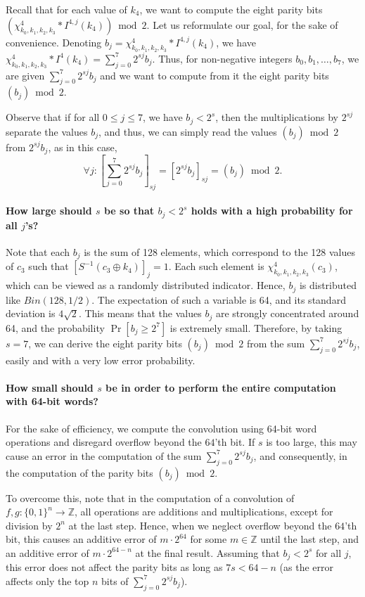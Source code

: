 Recall that for each value of $k_4$, we want to compute the eight parity bits 
$(\chi^4_{k_0,k_1,k_2,k_3} * I^{4,j}(k_4))\bmod 2$. Let us reformulate our goal, for the sake of convenience. Denoting $b_j=\chi^4_{k_0,k_1,k_2,k_3} * I^{4,j}(k_4)$, we have $\chi^4_{k_0,k_1,k_2,k_3} * I^{4}(k_4)=\sum_{j=0}^7 2^{sj}b_j$. Thus, for non-negative integers $b_0,b_1,\ldots,b_7$, we are given $\sum_{j=0}^7 2^{sj}b_j$ and we want to compute from it the eight parity bits $(b_j)\bmod 2$. 

Observe that if for all $0 \leq j \leq 7$, we have $b_j<2^s$, then the multiplications by $2^{sj}$ separate the values $b_j$, and thus, we can simply read the values $(b_j)\bmod 2$ from $2^{sj}b_j$, as in this case,
$$
\forall j: \left[\sum_{j=0}^7 2^{sj}b_j\right]_{sj} = [2^{sj}b_j]_{sj} = (b_j)\bmod 2.
$$
\paragraph{How large should $s$ be so that $b_j<2^s$ holds with a high probability for all $j$'s?} Note that each $b_j$ is the sum of 128 elements, which correspond to the 128 values of $c_3$ such that $[S^{-1}(c_3 \oplus k_4)]_j=1$. Each such element is $\chi^4_{k_0,k_1,k_2,k_3}(c_3)$, which can be viewed as a randomly distributed indicator. Hence, $b_j$ is distributed like $Bin(128,1/2)$. The expectation of such a variable is 64, and its standard deviation is $4\sqrt{2}$. This means that the values $b_j$ are strongly concentrated around 64, and the probability $\Pr[b_j\geq 2^7]$ is extremely small. Therefore, by taking $s=7$, we can derive the eight parity bits $(b_j)\bmod 2$ from the sum $\sum_{j=0}^7 2^{sj}b_j$, easily and with a very low error probability.
\paragraph{How small should $s$ be in order to perform the entire computation with 64-bit words?} For the sake of efficiency, we compute the convolution using 64-bit word operations and disregard overflow beyond the $64$'th bit. If $s$ is too large, this may cause an error in the computation of the sum $\sum_{j=0}^7 2^{sj}b_j$, and consequently, in the computation of the parity bits $(b_j)\bmod 2$. 

To overcome this, note that in the computation of a convolution of $f,g:\{0,1\}^n \to \mathbb{Z}$, all operations are additions and multiplications, except for division by $2^n$ at the last step. Hence, when we neglect overflow beyond the $64$'th bit, this causes an additive error of $m \cdot 2^{64}$ for some $m \in \mathbb{Z}$ until the last step, and an additive error of $m \cdot 2^{64-n}$ at the final result. Assuming that $b_j<2^{s}$ for all $j$, this error does not affect the parity bits as long as $7s<64-n$ (as the error affects only the top $n$ bits of $\sum_{j=0}^7 2^{sj}b_j$). 


